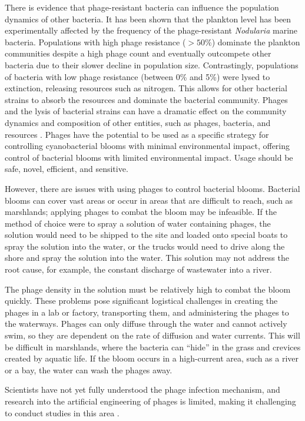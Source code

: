 There is evidence that phage-resistant bacteria can influence the population dynamics of other bacteria.
It has been shown that the plankton level has been experimentally affected by the frequency of the phage-resistant \textit{Nodularia} marine bacteria.
Populations with high phage resistance ($>50\%$) dominate the plankton communities despite a high phage count and eventually outcompete other bacteria due to their slower decline in population size.
Contrastingly, populations of bacteria with low phage resistance (between 0\% and 5\%) were lysed to extinction, releasing resources such as nitrogen.
This allows for other bacterial strains to absorb the resources and dominate the bacterial community.
Phages and the lysis of bacterial strains can have a dramatic effect on the community dynamics and composition of other entities, such as phages, bacteria, and resources \cite{colomaFrequencyVirusresistantHosts2019}.
Phages have the potential to be used as a specific strategy for controlling cyanobacterial blooms with minimal environmental impact, offering control of bacterial blooms with limited environmental impact.
Usage should be safe, novel, efficient, and sensitive.  

However, there are issues with using phages to control bacterial blooms.
Bacterial blooms can cover vast areas or occur in areas that are difficult to reach, such as marshlands; applying phages to combat the bloom may be infeasible.
If the method of choice were to spray a solution of water containing phages, the solution would need to be shipped to the site and loaded onto special boats to spray the solution into the water, or the trucks would need to drive along the shore and spray the solution into the water.
This solution may not address the root cause, for example, the constant discharge of wastewater into a river. 

The phage density in the solution must be relatively high to combat the bloom quickly.
These problems pose significant logistical challenges in creating the phages in a lab or factory, transporting them, and administering the phages to the waterways.
Phages can only diffuse through the water and cannot actively swim, so they are dependent on the rate of diffusion and water currents.
This will be difficult in marshlands, where the bacteria can “hide” in the grass and crevices created by aquatic life.
If the bloom occurs in a high-current area, such as a river or a bay, the water can wash the phages away.

Scientists have not yet fully understood the phage infection mechanism, and research into the artificial engineering of phages is limited, making it challenging to conduct studies in this area \cite{grassoReviewCyanophageHost2022, mckindlesDissolvedMicrocystinRelease2020}.
 
